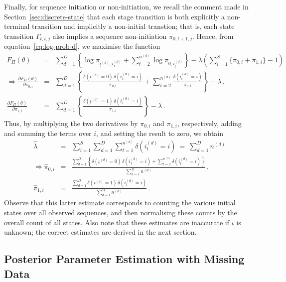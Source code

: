 \documentclass[a4paper]{article}
\newcommand{\ui}{\underline{\iota}}
\begin{document}
Finally, for sequence initiation or non-initiation, we recall the comment made in Section~\ref{sec:discrete-state} that each stage transition is both explicitly a non-terminal
transition and implicitly a non-initial transtion; that is, each state transition $\Gamma_{t,i,j}$ also implies a sequence non-initiation $\pi_{0,t+1,j}$.
Hence, from equation~\eqref{eq:log-prob-d}, we maximise the function
\begin{eqnarray}
  F_{\Pi}(\theta) & = & \sum_{d=1}^D \left\{\log\pi_{\ui^{(d)},i_1^{(d)}}+\sum_{t=2}^{n^{(d)}}\log\pi_{0,i_{t}^{(d)}}\right\}
-\lambda\left(\sum_{i=1}^{S}\{\pi_{0,i}+\pi_{1,i}\}-1\right)
\label{eq:F:pi}
\\
\Rightarrow\frac{\partial F_{\Pi}(\theta)}{\partial\pi_{0,i}} & = &
  \sum_{d=1}^D \left\{\frac{\delta(\ui^{(d)}\!=\!0)\,\delta(i_1^{(d)}\!=\!i)}{\pi_{0,i}}
+\sum_{t=2}^{n^{(d)}}\frac{\delta(i_t^{(d)}\!=\!i)}{\pi_{0,i}}\right\}-\lambda\,,
\nonumber\\
\frac{\partial F_{\Pi}(\theta)}{\partial\pi_{1,i}} & = &
  \sum_{d=1}^D \left\{\frac{\delta(\ui^{(d)}\!=\!1)\,\delta(i_1^{(d)}\!=\!i)}{\pi_{1,i}}\right\}-\lambda\,.
\end{eqnarray}
Thus, by multiplying the two derivatives by $\pi_{0,i}$ and $\pi_{1,i}$, respectively, adding and summing the terms over $i$, and setting the result to zero, we obtain
\begin{eqnarray}
\hat{\lambda} & = & \sum_{i=1}^{S}\sum_{d=1}^{D}\sum_{t=1}^{n^{(d)}}\delta(i_t^{(d)}\!=\!i)~=~\sum_{d=1}^{D}n^{(d)}
\nonumber\\
\Rightarrow \hat{\pi}_{0,i} & = & \frac{\sum_{d=1}^{D} \left\{\delta(\ui^{(d)}\!=\!0)\,\delta(i_1^{(d)}\!=\!i)
  +\sum_{t=2}^{n^{(d)}}\delta(i_t^{(d)}\!=\!i)\right\}}
                                                               {\sum_{d=1}^{D}n^{(d)}}\,,
\nonumber\\
\hat{\pi}_{1,i} & = & \frac{\sum_{d=1}^{D} \delta(\ui^{(d)}\!=\!1)\,\delta(i_1^{(d)}\!=\!i)}
                                                               {\sum_{d=1}^{D}n^{(d)}}\,.
\end{eqnarray}
Observe that this latter estimate corresponds to counting the various initial states over all observed sequences, and then normalising these counts by the overall count of all states.
Also note that these estimates are inaccurate if $\ui$ is unknown; the correct estimates are derived in the next section.

\subsection{Posterior Parameter Estimation with Missing Data}\label{sec:estimate-missing}
\end{document}
